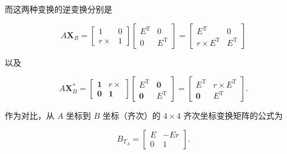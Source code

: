 \documentclass[10pt,a4paper]{book}
\theoremstyle{thmstyle} %
\theoremstyle{defstyle} %
\theoremstyle{prostyle} %
\begin{document}
而这两种变换的逆变换分别是



$$
A \mathbf { X } _ { B } = { \left[ \begin{array}{ll} { 1 } & { 0 } \\{ r \times } & { 1 } \end{array} \right] } { \left[ \begin{array}{ll} { E ^{\mathrm { T} } } & { 0 } \\{ 0 } & { E ^{\mathrm { T} } } \end{array} \right] } = { \left[ \begin{array}{ll} { E ^{\mathrm { T} } } & { 0 } \\{ r \times E ^{\mathrm { T} } } & { E ^{\mathrm { T} } } \end{array} \right] }
$$



以及



$$
A \mathbf { X } _ { B } ^{*} = \left[ \begin{array}{ll} { \mathbf { 1 } } & { r \times } \\{ \mathbf { 0 } } & { \mathbf { 1 } } \end{array} \right] \left[ \begin{array}{ll} { E ^{\mathrm { T} } } & { \mathbf { 0 } } \\{ \mathbf { 0 } } & { E ^{\mathrm { T} } } \end{array} \right] = \left[ \begin{array}{ll} { E ^{\mathrm { T} } } & { r \times E ^{\mathrm { T} } } \\{ \mathbf { 0 } } & { E ^{\mathrm { T} } } \end{array} \right] .
$$



作为对比，从 $A$ 坐标到 $B$ 坐标（齐次）的 $4 \times 4$ 齐次坐标变换矩阵的公式为



$$
B _ { T _ { A } } = \left[ \begin{array}{ll} { { E } } & { { - E r } } \\{ { 0 } } & { { 1 } } \end{array} \right] .
$$
\end{document}
